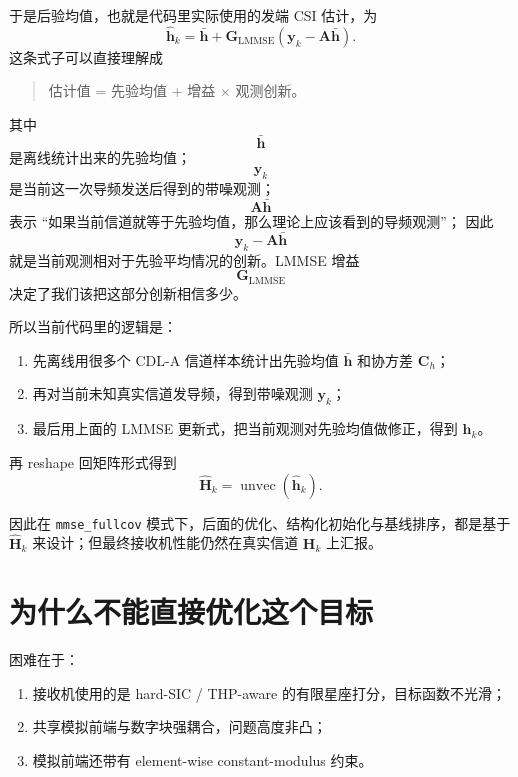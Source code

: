 \documentclass[11pt]{ctexart}
\newcommand{\code}[1]{\texttt{#1}}
\begin{document}
于是后验均值，也就是代码里实际使用的发端 CSI 估计，为
\begin{equation}
    \widehat{\bm{h}}_k
    =
    \bar{\bm{h}}
    +
    \bm{G}_{\mathrm{LMMSE}}
    \left(
        \bm{y}_k-\bm{A}\bar{\bm{h}}
    \right).
\end{equation}
这条式子可以直接理解成
\begin{quote}
估计值 = 先验均值 + 增益 $\times$ 观测创新。
\end{quote}
其中
\begin{equation}
    \bar{\bm h}
\end{equation}
是离线统计出来的先验均值；
\begin{equation}
    \bm y_k
\end{equation}
是当前这一次导频发送后得到的带噪观测；
\begin{equation}
    \bm A\bar{\bm h}
\end{equation}
表示 ``如果当前信道就等于先验均值，那么理论上应该看到的导频观测''；
因此
\begin{equation}
    \bm y_k-\bm A\bar{\bm h}
\end{equation}
就是当前观测相对于先验平均情况的创新。LMMSE 增益
\begin{equation}
    \bm G_{\mathrm{LMMSE}}
\end{equation}
决定了我们该把这部分创新相信多少。

所以当前代码里的逻辑是：
\begin{enumerate}
    \item 先离线用很多个 CDL-A 信道样本统计出先验均值 $\bar{\bm h}$ 和协方差 $\bm C_h$；
    \item 再对当前未知真实信道发导频，得到带噪观测 $\bm y_k$；
    \item 最后用上面的 LMMSE 更新式，把当前观测对先验均值做修正，得到 $\widehat{\bm h}_k$。
\end{enumerate}
再 reshape 回矩阵形式得到
\begin{equation}
    \widehat{\bm{H}}_k
    =
    \operatorname{unvec}(\widehat{\bm{h}}_k).
\end{equation}

因此在 \code{mmse\_fullcov} 模式下，后面的优化、结构化初始化与基线排序，都是基于 $\widehat{\bm{H}}_k$ 来设计；但最终接收机性能仍然在真实信道 $\bm{H}_k$ 上汇报。

\section{为什么不能直接优化这个目标}
困难在于：
\begin{enumerate}
    \item 接收机使用的是 hard-SIC / THP-aware 的有限星座打分，目标函数不光滑；
    \item 共享模拟前端与数字块强耦合，问题高度非凸；
    \item 模拟前端还带有 element-wise constant-modulus 约束。
\end{enumerate}
\end{document}
